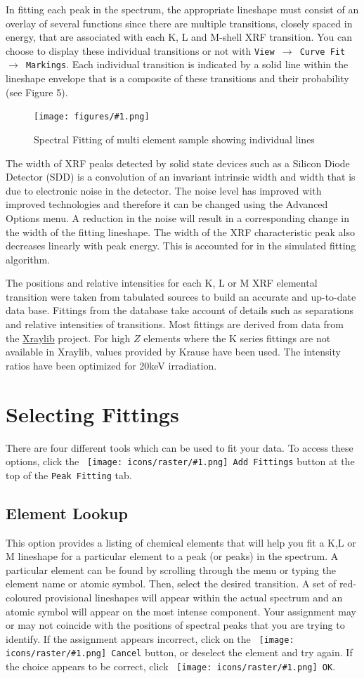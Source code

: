 \documentclass[article,twoside,11pt]{report}
\newcommand{\command}[1]{\texttt{#1}}
\newcommand{\icon}[1]{\texttt{[image: icons/raster/\#1.png]}}
\newcommand{\button}[2]{\ \command{\icon{#1} #2}}
\newcommand{\menu}[0]{$\rightarrow$}
\newcommand{\screenshot}[2]{%
\begin{figure}[h!]
\centering\texttt{[image: figures/\#1.png]}
\caption{#2}
\end{figure}
}
\newcommand{\tocsection}[1]{\section*{#1}\addcontentsline{toc}{section}{#1}}
\newcommand{\tocsubsection}[1]{\subsection*{#1}\addcontentsline{toc}{subsection}{#1}}
\begin{document}
In fitting each peak in the spectrum, the appropriate lineshape must consist of an overlay of several functions since there are multiple transitions, closely spaced in energy, that are associated with each K, L and M-shell XRF transition. You can choose to display these individual transitions or not with \command{View \menu\ Curve Fit \menu\ Markings}. Each individual transition is indicated by a solid line within the lineshape envelope that is a composite of these transitions and their probability (see Figure 5). 

\screenshot{fitting-markings}{Spectral Fitting of multi element sample showing individual lines}

The width of XRF peaks detected by solid state devices such as a Silicon Diode Detector (SDD) is a convolution of an invariant intrinsic width and width that is due to electronic noise in the detector. The noise level has improved with improved technologies and therefore it can be changed using the Advanced Options menu. A reduction in the noise will result in a corresponding change in the width of the fitting lineshape. The width of the XRF characteristic peak also decreases linearly with peak energy. This is accounted for in the simulated fitting algorithm.   

The positions and relative intensities for each K, L or M XRF elemental transition were taken from tabulated sources to build an accurate and up-to-date data base. Fittings from the database take account of details such as separations and relative intensities of transitions. Most fittings are derived from data from the \href{https://github.com/tschoonj/xraylib}{Xraylib} \cite{xraylib} project. For high $Z$ elements where the K series fittings are not available in Xraylib, values provided by Krause \cite{krause} have been used. The intensity ratios have been optimized for 20keV irradiation.


\tocsection{Selecting Fittings}

There are four different tools which can be used to fit your data. To access these options, click the \button{edit-add}{Add Fittings} button at the top of the \command{Peak Fitting} tab.


\tocsubsection{Element Lookup}

This option provides a listing of chemical elements that will help you fit a K,L or M lineshape for a particular element to a peak (or peaks) in the spectrum. A particular element can be found by scrolling through the menu or typing the element name or atomic symbol. Then, select the desired transition. A set of red-coloured provisional lineshapes will appear within the actual spectrum and an atomic symbol will appear on the most intense component. Your assignment may or may not coincide with the positions of spectral peaks that you are trying to identify. If the assignment appears incorrect, click on the \button{choose-cancel}{Cancel} button, or deselect the element and try again. If the choice appears to be correct, click \button{choose-ok}{OK}.
\end{document}
